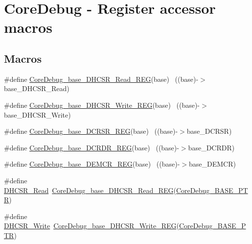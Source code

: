 \hypertarget{group___core_debug___register___accessor___macros}{}\section{Core\+Debug -\/ Register accessor macros}
\label{group___core_debug___register___accessor___macros}
\subsection*{Macros}
\begin{DoxyCompactItemize}
\item 
\#define \hyperlink{group___core_debug___register___accessor___macros_gaea44925e7b9cc3155d55c86d77ecb8dc}{Core\+Debug\+\_\+base\+\_\+\+D\+H\+C\+S\+R\+\_\+\+Read\+\_\+\+R\+EG}(base)        ~((base)-\/$>$base\+\_\+\+D\+H\+C\+S\+R\+\_\+\+Read)
\item 
\#define \hyperlink{group___core_debug___register___accessor___macros_gaf54a5a2086e1362b034c5ae9d566f261}{Core\+Debug\+\_\+base\+\_\+\+D\+H\+C\+S\+R\+\_\+\+Write\+\_\+\+R\+EG}(base)      ~((base)-\/$>$base\+\_\+\+D\+H\+C\+S\+R\+\_\+\+Write)
\item 
\#define \hyperlink{group___core_debug___register___accessor___macros_ga5f44f54e6c3b28720c9f888292d2eef5}{Core\+Debug\+\_\+base\+\_\+\+D\+C\+R\+S\+R\+\_\+\+R\+EG}(base)                  ~((base)-\/$>$base\+\_\+\+D\+C\+R\+SR)
\item 
\#define \hyperlink{group___core_debug___register___accessor___macros_gac60388e54792a5460ba042a1e6917ce7}{Core\+Debug\+\_\+base\+\_\+\+D\+C\+R\+D\+R\+\_\+\+R\+EG}(base)                  ~((base)-\/$>$base\+\_\+\+D\+C\+R\+DR)
\item 
\#define \hyperlink{group___core_debug___register___accessor___macros_ga068f04cd2820bf5a12caeb1c9f6afa51}{Core\+Debug\+\_\+base\+\_\+\+D\+E\+M\+C\+R\+\_\+\+R\+EG}(base)                  ~((base)-\/$>$base\+\_\+\+D\+E\+M\+CR)
\item 
\#define \hyperlink{group___core_debug___register___accessor___macros_ga7d77eafe76b2000c7159e58e11ade9a1}{D\+H\+C\+S\+R\+\_\+\+Read}~\hyperlink{group___core_debug___register___accessor___macros_gaea44925e7b9cc3155d55c86d77ecb8dc}{Core\+Debug\+\_\+base\+\_\+\+D\+H\+C\+S\+R\+\_\+\+Read\+\_\+\+R\+EG}(\hyperlink{group___core_debug___peripheral_ga994a185afca30ede538d89322c4f0326}{Core\+Debug\+\_\+\+B\+A\+S\+E\+\_\+\+P\+TR})
\item 
\#define \hyperlink{group___core_debug___register___accessor___macros_ga3c374ff0f88587d03fd707ebc0a06169}{D\+H\+C\+S\+R\+\_\+\+Write}~\hyperlink{group___core_debug___register___accessor___macros_gaf54a5a2086e1362b034c5ae9d566f261}{Core\+Debug\+\_\+base\+\_\+\+D\+H\+C\+S\+R\+\_\+\+Write\+\_\+\+R\+EG}(\hyperlink{group___core_debug___peripheral_ga994a185afca30ede538d89322c4f0326}{Core\+Debug\+\_\+\+B\+A\+S\+E\+\_\+\+P\+TR})

\end{DoxyCompactItemize}
